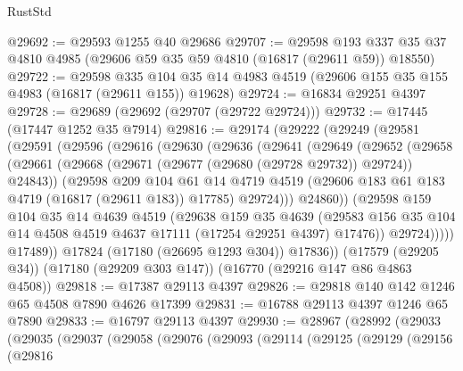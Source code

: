 \begin{lexlean}{RustStd}
\begin{coremodule}
{\begin{coremodule}
{{{{{{{{{{{{{{{{{{{{{{{{{{{{{{{{{{{{{{{{{{{{{{{{{{{{{{{@29692 := @29593 @1255 @40 @29686
@29707 := @29598
    @193
    @337
    @35
    @37
    @4810
    @4985
    (@29606 @59 @35 @59 @4810 (@16817 (@29611 @59)) @18550)
@29722 := @29598
    @335
    @104
    @35
    @14
    @4983
    @4519
    (@29606 @155 @35 @155 @4983 (@16817 (@29611 @155)) @19628)
@29724 := @16834 @29251 @4397
@29728 := @29689 (@29692 (@29707 (@29722 @29724)))
@29732 := @17445 (@17447 @1252 @35 @7914)
@29816 := @29174
    (@29222
      (@29249
        (@29581
          (@29591
            (@29596
              (@29616
                (@29630
                  (@29636
                    (@29641
                      (@29649
                        (@29652
                          (@29658
                            (@29661
                              (@29668 (@29671 (@29677 (@29680 (@29728 @29732)) @29724)) @24843))
                            (@29598
                              @209
                              @104
                              @61
                              @14
                              @4719
                              @4519
                              (@29606 @183 @61 @183 @4719 (@16817 (@29611 @183)) @17785)
                              @29724)))
                        @24860))
                    (@29598
                      @159
                      @104
                      @35
                      @14
                      @4639
                      @4519
                      (@29638
                        @159
                        @35
                        @4639
                        (@29583
                          @156
                          @35
                          @104
                          @14
                          @4508
                          @4519
                          @4637
                          @17111
                          (@17254 @29251 @4397)
                          @17476))
                      @29724)))))
            @17489))
        @17824
        (@17180 (@26695 @1293 @304))
        @17836))
    (@17579 (@29205 @34))
    (@17180 (@29209 @303 @147))
    (@16770 (@29216 @147 @86 @4863 @4508))
@29818 := @17387 @29113 @4397
@29826 := @29818 @140 @142 @1246 @65 @4508 @7890 @4626 @17399
@29831 := @16788 @29113 @4397 @1246 @65 @7890
@29833 := @16797 @29113 @4397
@29930 := @28967
    (@28992
      (@29033
        (@29035
          (@29037
            (@29058
              (@29076
                (@29093
                  (@29114
                    (@29125
                      (@29129
                        (@29156
                          (@29816
}}}}}}}}}}}}}}}}}}}}}}}}}}}}}}}}}}}}}}}}}}}}}}}}}}}}}}}
\end{coremodule}}
\end{coremodule}
\end{lexlean}
